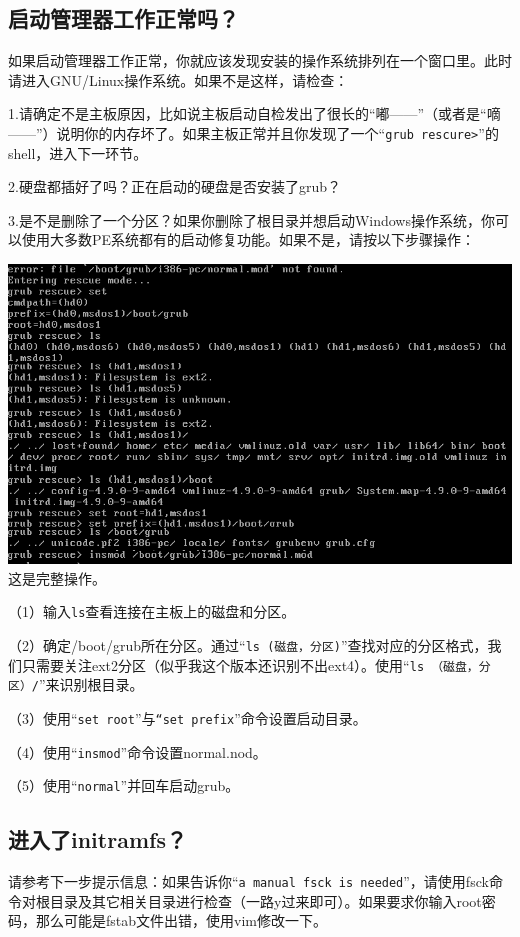 \subsection{启动管理器工作正常吗？}
如果启动管理器工作正常，你就应该发现安装的操作系统排列在一个窗口里。此时请进入GNU/Linux操作系统。如果不是这样，请检查：\par
1.请确定不是主板原因，比如说主板启动自检发出了很长的“嘟——”（或者是“嘀——”）说明你的内存坏了。如果主板正常并且你发现了一个“\verb|grub rescure>|”的shell，进入下一环节。\par
2.硬盘都插好了吗？正在启动的硬盘是否安装了grub？\par
3.是不是删除了一个分区？如果你删除了根目录并想启动Windows操作系统，你可以使用大多数PE系统都有的启动修复功能。如果不是，请按以下步骤操作：
\begin{center}
	\includegraphics{pic/grubrescure}\\
	这是完整操作。
\end{center} \par
（1）输入\verb|ls|查看连接在主板上的磁盘和分区。\par
（2）确定/boot/grub所在分区。通过“\verb|ls (磁盘，分区)|”查找对应的分区格式，我们只需要关注ext2分区（似乎我这个版本还识别不出ext4）。使用“\verb|ls （磁盘，分区）/|”来识别根目录。\par
（3）使用“\verb|set root|”与\verb|“set prefix|”命令设置启动目录。\par
（4）使用“\verb|insmod|”命令设置normal.nod。\par
（5）使用“\verb|normal|”并回车启动grub。
\subsection{进入了initramfs？}
请参考下一步提示信息：如果告诉你“\verb|a manual fsck is needed|”，请使用fsck命令对根目录及其它相关目录进行检查（一路y过来即可）。如果要求你输入root密码，那么可能是fstab文件出错，使用vim修改一下。

